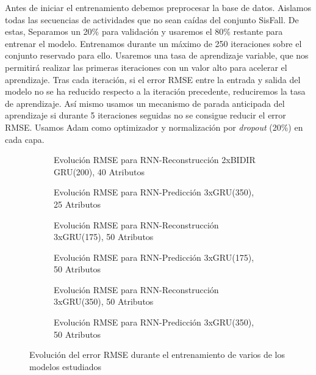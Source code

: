 Antes de iniciar el entrenamiento debemos preprocesar la base de datos. Aislamos todas las secuencias de actividades que no sean caídas del conjunto SisFall. De estas, Separamos un 20\% para validación y usaremos el 80\% restante para entrenar el modelo. Entrenamos durante un máximo de 250 iteraciones sobre el conjunto reservado para ello. Usaremos una tasa de aprendizaje variable, que nos permitirá realizar las primeras iteraciones con un valor alto para acelerar el aprendizaje. Tras cada iteración, si el error RMSE entre la entrada y salida del modelo no se ha reducido respecto a la iteración precedente, reduciremos la tasa de aprendizaje. Así mismo usamos un mecanismo de parada anticipada del aprendizaje si durante 5 iteraciones seguidas no se consigue reducir el error RMSE. Usamos Adam como optimizador y normalización por \textit{dropout} (20\%) en cada capa. 


\begin{figure}[h!t]
  \centering
  \begin{subfigure}[t]{0.32\textwidth}
      \centering
      \caption{\footnotesize \footnotesize \label{fig:rnnTrain:recon:bidir:40}Evolución RMSE para RNN-Reconstrucción 2xBIDIR GRU(200), 40 Atributos}
  \end{subfigure}
  \hfill
  \begin{subfigure}[t]{0.32\textwidth}
      \centering
      \caption{\footnotesize \footnotesize \label{fig:rnnTrain:predict:25}Evolución RMSE para RNN-Predicción 3xGRU(350), 25 Atributos}
  \end{subfigure}
  \hfill
  \begin{subfigure}[t]{0.32\textwidth}
      \centering
      \caption{\footnotesize \footnotesize \label{fig:rnnTrain:recon:175}Evolución RMSE para RNN-Reconstrucción 3xGRU(175), 50 Atributos}
  \end{subfigure}
  \begin{subfigure}[t]{0.32\textwidth}
      \centering
      \caption{\footnotesize \footnotesize \label{fig:rnnTrain:predict:175}Evolución RMSE para RNN-Predicción 3xGRU(175), 50 Atributos}
  \end{subfigure}
  \hfill
  \begin{subfigure}[t]{0.32\textwidth}
      \centering
      \caption{\footnotesize \footnotesize \label{fig:rnnTrain:recon:50}Evolución RMSE para RNN-Reconstrucción 3xGRU(350), 50 Atributos}
  \end{subfigure}
  \hfill
  \begin{subfigure}[t]{0.32\textwidth}
      \centering
      \caption{\footnotesize \footnotesize \label{fig:modelo:rnnTrain:predict:50}Evolución RMSE para RNN-Predicción 3xGRU(350), 50 Atributos}
  \end{subfigure}
  \caption{\label{fig:rnn:training} Evolución del error RMSE durante el entrenamiento de varios de los modelos estudiados}
\end{figure}


